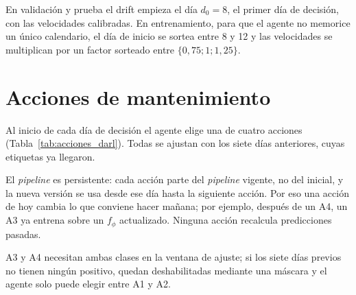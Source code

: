 En validación y prueba el drift empieza el día $d_0 = 8$, el primer día de decisión, con las
velocidades calibradas. En entrenamiento, para que el agente no memorice un único calendario, el
día de inicio se sortea entre 8 y 12 y las velocidades se multiplican por un factor sorteado
entre $\{0{,}75; 1; 1{,}25\}$.

\section{Acciones de mantenimiento}
\label{sec:met_acciones}

Al inicio de cada día de decisión el agente elige una de cuatro acciones
(Tabla~\ref{tab:acciones_darl}). Todas se ajustan con los siete días anteriores, cuyas etiquetas
ya llegaron.

\begin{table}[H]
    \centering
    \caption{Acciones de mantenimiento de DARL}
    \label{tab:acciones_darl}
\end{table}

El \textit{pipeline} es persistente: cada acción parte del \textit{pipeline} vigente, no del
inicial, y la nueva versión se usa desde ese día hasta la siguiente acción. Por eso una acción
de hoy cambia lo que conviene hacer mañana; por ejemplo, después de un A4, un A3 ya entrena
sobre un $f_\phi$ actualizado. Ninguna acción recalcula predicciones pasadas.

A3 y A4 necesitan ambas clases en la ventana de ajuste; si los siete días previos no tienen
ningún positivo, quedan deshabilitadas mediante una máscara y el agente solo puede elegir entre
A1 y A2.


